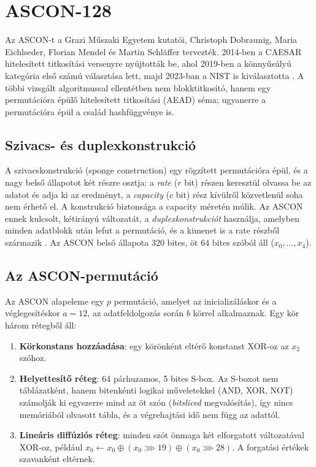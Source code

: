 \documentclass[a4paper,12pt]{report}
\theoremstyle{definition}
\theoremstyle{remark}
\begin{document}
\section{ASCON-128}\label{sec:ascon}

Az ASCON-t a Grazi Műszaki Egyetem kutatói, Christoph Dobraunig, Maria Eichlseder, Florian Mendel és Martin Schläffer tervezték. 2014-ben a CAESAR hitelesített titkosítási versenyre nyújtották be, ahol 2019-ben a könnyűsúlyú kategória első számú választása lett, majd 2023-ban a NIST is kiválasztotta \cite{Dobraunig2021,NISTLWC2023}. A többi vizsgált algoritmussal ellentétben nem blokktitkosító, hanem egy permutációra épülő hitelesített titkosítási (AEAD) séma; ugyanerre a permutációra épül a család hashfüggvénye is.

\subsection{Szivacs- és duplexkonstrukció}\label{sec:ascon_szivacs}

A szivacskonstrukció (sponge construction) egy rögzített permutációra épül, és a nagy belső állapotot két részre osztja: a \emph{rate} ($r$ bit) részen keresztül olvassa be az adatot és adja ki az eredményt, a \emph{capacity} ($c$ bit) rész kívülről közvetlenül soha nem érhető el. A konstrukció biztonsága a capacity méretén múlik. Az ASCON ennek kulcsolt, kétirányú változatát, a \emph{duplexkonstrukciót} használja, amelyben minden adatblokk után lefut a permutáció, és a kimenet is a rate részből származik \cite{Dobraunig2021}. Az ASCON belső állapota 320 bites, öt 64 bites szóból áll ($x_0, \ldots, x_4$).

\subsection{Az ASCON-permutáció}\label{sec:ascon_perm}

Az ASCON alapeleme egy $p$ permutáció, amelyet az inicializáláskor és a véglegesítéskor $a = 12$, az adatfeldolgozás során $b$ körrel alkalmaznak. Egy kör három rétegből áll:

\begin{enumerate}
	\item \textbf{Körkonstans hozzáadása}: egy körönként eltérő konstanst XOR-oz az $x_2$ szóhoz.
	\item \textbf{Helyettesítő réteg}: 64 párhuzamos, 5 bites S-box. Az S-boxot nem táblázatként, hanem bitenkénti logikai műveletekkel (AND, XOR, NOT) számolják ki egyszerre mind az öt szón (\emph{bitsliced} megvalósítás), így nincs memóriából olvasott tábla, és a végrehajtási idő nem függ az adattól.
	\item \textbf{Lineáris diffúziós réteg}: minden szót önmaga két elforgatott változatával XOR-oz, például $x_0 \leftarrow x_0 \oplus (x_0 \ggg 19) \oplus (x_0 \ggg 28)$. A forgatási értékek szavanként eltérnek.
\end{enumerate}
\end{document}
